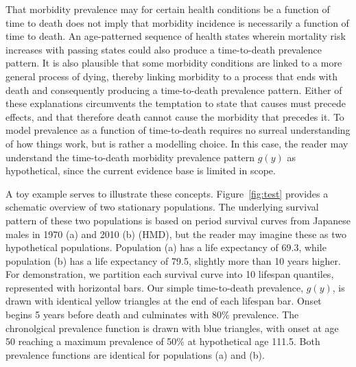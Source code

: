 \documentclass[11pt,oneside,a4paper]{article} %
\begin{document}
That morbidity prevalence may for certain health conditions be a function of
time to death does not imply that morbidity incidence is necessarily a function of time to death. An
age-patterned sequence of health states wherein mortality risk increases with
passing states could also produce a time-to-death prevalence pattern. It is also
plausible that some morbidity conditions are linked to a more general process of
dying, thereby linking morbidity to a process that ends with death and
consequently producing a time-to-death prevalence pattern. Either of
these explanations circumvents the temptation to state that causes must
precede effects, and that therefore death cannot cause the morbidity that
precedes it. To model prevalence as a function of time-to-death requires no
surreal understanding of how things work, but is rather a modelling choice. In
this case, the reader may understand the time-to-death morbidity prevalence
pattern $g(y)$ as hypothetical, since the current evidence base is limited in
scope.
 
A toy example serves to illustrate these concepts. Figure~\ref{fig:test}
provides a schematic overview of two stationary populations. The
underlying survival pattern of these two populations is based on period survival
curves from Japanese males in 1970 (a) and 2010 (b) (HMD), but the reader may
imagine these as two hypothetical populations. Population (a) has a life
expectancy of 69.3, while population (b) has a life expectancy of 79.5, slightly
more than 10 years higher. For demonstration, we partition each survival curve
into 10 lifespan quantiles, represented with horizontal bars. Our simple
time-to-death prevalence, $g(y)$, is drawn with identical yellow triangles at
the end of each lifespan bar. Onset begins 5 years before death and culminates with 80\%
prevalence. The chronolgical prevalence function is drawn with blue triangles,
with onset at age 50 reaching a maximum prevalence of 50\% at hypothetical age
111.5. Both prevalence functions are identical for populations (a) and (b). 
\end{document}

